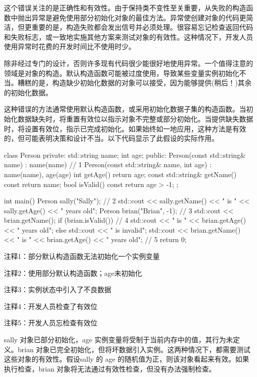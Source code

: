 这个错误关注的是正确性和有效性。由于保持类不变性至关重要，从失败的构造函数中抛出异常是避免使用部分初始化对象的最佳方法。异常使创建对象的代码更简洁，但更重要的是，构造失败都会发出信号并必须处理。很容易忘记检查返回代码和失败标志，或一致地实施其他方案来测试对象的有效性。这种情况下，开发人员使用异常时花费的开发时间比不使用时少。


除非经过专门的设计，否则许多现有代码很少能很好地使用异常。一个值得注意的领域是对象的构造。默认构造函数可能被过度使用，导致某些变量实例初始化不当。糟糕的是，构造缺少初始化数据的对象可以接受，因为能够提供(稍后！)其余的初始化数据。

这种错误的方法通常使用默认构造函数，或采用初始化数据子集的构造函数。当初始化数据缺失时，将重置有效位以指示对象不完整或部分初始化。当提供缺失数据时，将设置有效位，指示已完成初始化。如果始终如一地应用，这种方法是有效的，但可能表明决策和设计不当。以下代码显示了此假设的实际作用。


\begin{cpp}
class Person {
private:
  std::string name;
  int age;
public:
  Person(const std::string& name) : name(name) {} // 1
  Person(const std::string& name, int age) : name(name), age(age) {}
  int getAge() { return age; }
  const std::string& getName() const { return name; }
  bool isValid() const { return age > -1; }
};

int main() {
  Person sally("Sally"); // 2
  std::cout << sally.getName() << " is " << sally.getAge()
    << " years old\n";
  Person brian("Brian", -1); // 3
  std::cout << brian.getName();
  if (brian.isValid()) // 4
    std::cout << " is " << brian.getAge() << " years old\n";
  else
    std::cout << " is invalid\n";
  std::cout << brian.getName() << " is " << brian.getAge() <<
    " years old\n"; // 5
  return 0;
}
\end{cpp}

{\footnotesize
注释1：部分默认构造函数无法初始化一个实例变量

注释2：使用部分默认构造函数；age未初始化

注释3：实例状态中引入了不良数据

注释4：开发人员检查了有效位

注释5：开发人员忘检查有效位
}

sally 对象已部分初始化，age 实例变量将受制于当前内存中的值，其行为未定义。brian 对象已完全初始化，但将坏数据引入实例。这两种情况下，都需要测试这些对象的有效性。假设sally 的 age 的随机值为正，则该对象看起来有效。如果执行检查，brian 对象将无法通过有效性检查，但没有办法强制检查。

